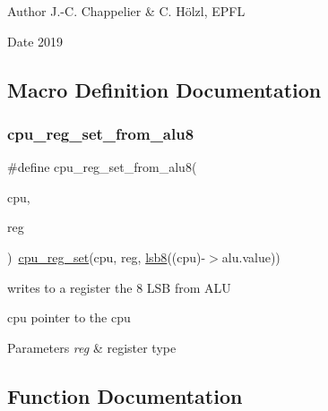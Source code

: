\begin{DoxyAuthor}{Author}
J.-\/C. Chappelier \& C. Hölzl, E\+P\+FL 
\end{DoxyAuthor}
\begin{DoxyDate}{Date}
2019 
\end{DoxyDate}


\subsection{Macro Definition Documentation}
\mbox{\label{cpu-registers_8h_ada31ffcbbeebed96cc72f2d9bab0f6b0}} 
\subsubsection{\texorpdfstring{cpu\+\_\+reg\+\_\+set\+\_\+from\+\_\+alu8}{cpu\_reg\_set\_from\_alu8}}
{\footnotesize\ttfamily \#define cpu\+\_\+reg\+\_\+set\+\_\+from\+\_\+alu8(\begin{DoxyParamCaption}\item[{}]{cpu,  }\item[{}]{reg }\end{DoxyParamCaption})~\hyperlink{cpu-registers_8h_a422598e03e342ec1c700cd61a3bc69b6}{cpu\+\_\+reg\+\_\+set}(cpu, reg, \hyperlink{bit_8h_aa7214f9bc705f6d655fafa3a15f672e8}{lsb8}((cpu)-\/$>$alu.\+value))}



writes to a register the 8 L\+SB from A\+LU 

cpu pointer to the cpu 
\begin{DoxyParams}{Parameters}
{\em reg} & register type \\
\hline
\end{DoxyParams}


\subsection{Function Documentation}
\mbox{\label{cpu-registers_8h_abe62e977d253f7a6be79d0b5ca8f105f}} 
